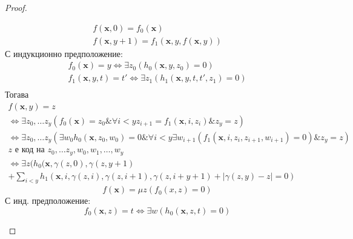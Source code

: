 \begin{proof}
\begin{itemize}
\begin{equation*}
                \begin{split}
                    f(\textbf{x}, 0) = f_0(\textbf{x}) \\
                    f(\textbf{x}, y+1) = f_1(\textbf{x}, y, f(\textbf{x}, y))
                \end{split}
            \end{equation*}
            С индукционно предположение:
            \begin{equation*}
                \begin{split}
                    f_0(\textbf{x}) = y \iff \exists z_0 (h_0(\textbf{x}, y, z_0) = 0) \\
                    f_1(\textbf{x}, y, t) = t' \iff \exists z_1 (h_1(\textbf{x}, y, t, t', z_1) = 0) \\
                \end{split}
            \end{equation*}
            Тогава
            \begin{equation*}
                \begin{split}
                    f(\textbf{x}, y) = z \\ 
                    \iff \exists z_0, \dots z_y (f_0(\textbf{x}) = z_0 \& \forall i < y z_{i+1} = f_1(\textbf{x}, i, z_i) \& z_y = z) \\
                    \iff \exists z_0, \dots z_y (\exists w_0 h_0(\textbf{x}, z_0, w_0) = 0 \& \forall i < y \exists w_{i+1} (f_1(\textbf{x}, i, z_i, z_{i+1}, w_{i+1}) = 0) \& z_y = z) \\
                    z \text{ е код на } z_0, \dots z_y, w_0, w_1, \dots, w_y \\
                    \iff \exists z ( h_0(\textbf{x}, \gamma(z, 0), \gamma(z, y+1) \\
                    + \sum\limits_{i<y} h_1(\textbf{x}, i, \gamma(z, i), \gamma(z, i+1), \gamma(z, i+y+1) + |\gamma(z, y) - z| = 0 )
                \end{split}
            \end{equation*}
            \subitem[минимизация]
            \begin{equation*}
                f(\textbf{x}) = \mu z (f_0(x, z) = 0)
            \end{equation*}
            С инд. предположение:
            \begin{equation*}
                f_0(\textbf{x}, z) = t \iff \exists w (h_0(\textbf{x}, z, t) = 0)
            \end{equation*}

\end{itemize}
\end{proof}
